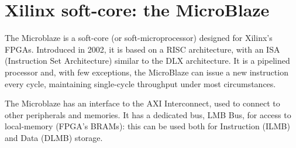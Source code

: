 
\section{Xilinx soft-core: the MicroBlaze}

The Microblaze is a soft-core (or soft-microprocessor) designed for Xilinx's FPGAs. Introduced in 2002, it is based on a RISC architecture, with an ISA (Instruction Set Architecture) similar to the DLX architecture. It is a pipelined processor and, with few exceptions, the MicroBlaze can issue a new instruction every cycle, maintaining single-cycle throughput under most circumstances.\bigskip

The Microblaze has an interface to the AXI Interconnect, used to connect to other peripherals and memories. It has a dedicated bus, LMB Bus, for access to local-memory (FPGA's BRAMs): this can be used both for Instruction (ILMB) and Data (DLMB) storage.

